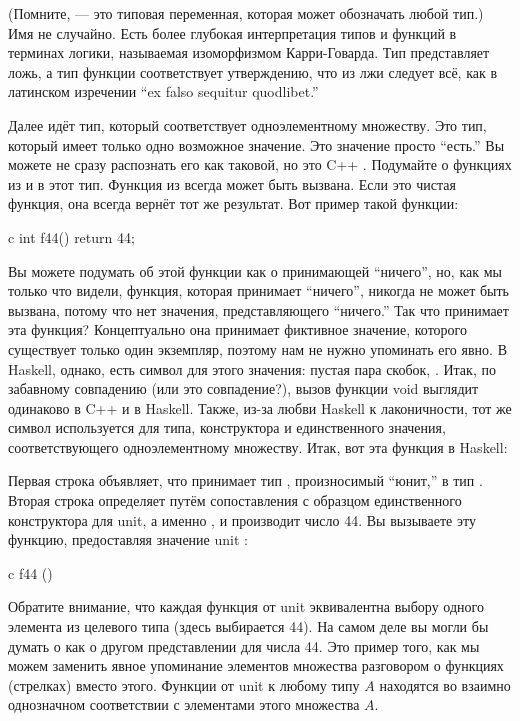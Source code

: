 (Помните,  --- это типовая переменная, которая может обозначать любой тип.)
Имя не случайно. Есть более глубокая интерпретация типов
и функций в терминах логики, называемая изоморфизмом Карри-Говарда.
Тип  представляет ложь, а тип функции
 соответствует утверждению, что из лжи следует
всё, как в латинском изречении ``ex falso sequitur quodlibet.''

Далее идёт тип, который соответствует одноэлементному множеству. Это тип, который
имеет только одно возможное значение. Это значение просто ``есть.'' Вы можете не
сразу распознать его как таковой, но это C++ .
Подумайте о функциях из и в этот тип. Функция из 
всегда может быть вызвана. Если это чистая функция, она всегда вернёт
тот же результат. Вот пример такой функции:

\begin{snip}{c}
int f44() { return 44; }
\end{snip}
Вы можете подумать об этой функции как о принимающей ``ничего'', но, как мы только что
видели, функция, которая принимает ``ничего'', никогда не может быть вызвана, потому что
нет значения, представляющего ``ничего.'' Так что принимает эта функция?
Концептуально она принимает фиктивное значение, которого существует только один
экземпляр, поэтому нам не нужно упоминать его явно. В Haskell,
однако, есть символ для этого значения: пустая пара скобок,
\code{()}. Итак, по забавному совпадению (или это совпадение?),
вызов функции void выглядит одинаково в C++ и в Haskell. Также,
из-за любви Haskell к лаконичности, тот же символ \code{()}
используется для типа, конструктора и единственного значения, соответствующего
одноэлементному множеству. Итак, вот эта функция в Haskell:

Первая строка объявляет, что  принимает тип \code{()},
произносимый ``юнит,'' в тип . Вторая строка
определяет  путём сопоставления с образцом единственного конструктора для unit,
а именно \code{()}, и производит число 44. Вы вызываете эту функцию,
предоставляя значение unit \code{()}:

\begin{snip}{c}
f44 ()
\end{snip}
Обратите внимание, что каждая функция от unit эквивалентна выбору одного
элемента из целевого типа (здесь выбирается  44). На
самом деле вы могли бы думать о  как о другом представлении для
числа 44. Это пример того, как мы можем заменить явное упоминание
элементов множества разговором о функциях (стрелках) вместо этого.
Функции от unit к любому типу $A$ находятся во взаимно однозначном соответствии с
элементами этого множества $A$.

